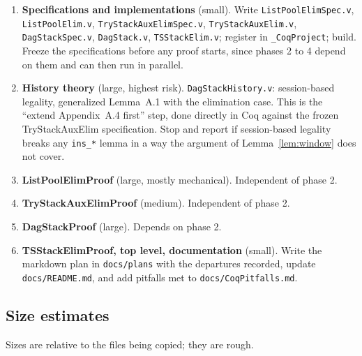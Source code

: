 \documentclass[11pt]{article}
\theoremstyle{definition}
\theoremstyle{remark}
\newcommand{\code}[1]{\texttt{#1}}
\newcommand{\file}[1]{\texttt{#1}}
\newcommand{\sol}[1]{\textbf{#1}}
\begin{document}
\begin{enumerate}
\item \sol{Specifications and implementations} (small). Write
  \file{ListPoolElimSpec.v}, \file{ListPoolElim.v},
  \file{TryStackAuxElimSpec.v}, \file{TryStackAuxElim.v},
  \file{DagStackSpec.v}, \file{DagStack.v}, \file{TSStackElim.v}; register
  in \file{\_CoqProject}; build. Freeze the specifications before any
  proof starts, since phases 2 to 4 depend on them and can then run in
  parallel.
\item \sol{History theory} (large, highest risk). \file{DagStackHistory.v}:
  session-based legality, generalized Lemma~A.1 with the elimination
  case. This is the ``extend Appendix~A.4 first'' step, done directly in
  Coq against the frozen TryStackAuxElim specification. Stop and report
  if session-based legality breaks any \code{ins\_*} lemma in a way the
  argument of Lemma~\ref{lem:window} does not cover.
\item \sol{ListPoolElimProof} (large, mostly mechanical). Independent of
  phase 2.
\item \sol{TryStackAuxElimProof} (medium). Independent of phase 2.
\item \sol{DagStackProof} (large). Depends on phase 2.
\item \sol{TSStackElimProof, top level, documentation} (small). Write
  the markdown plan in \file{docs/plans} with the departures recorded,
  update \file{docs/README.md}, and add pitfalls met to
  \file{docs/CoqPitfalls.md}.
\end{enumerate}

\subsection{Size estimates}

Sizes are relative to the files being copied; they are rough.
\end{document}
